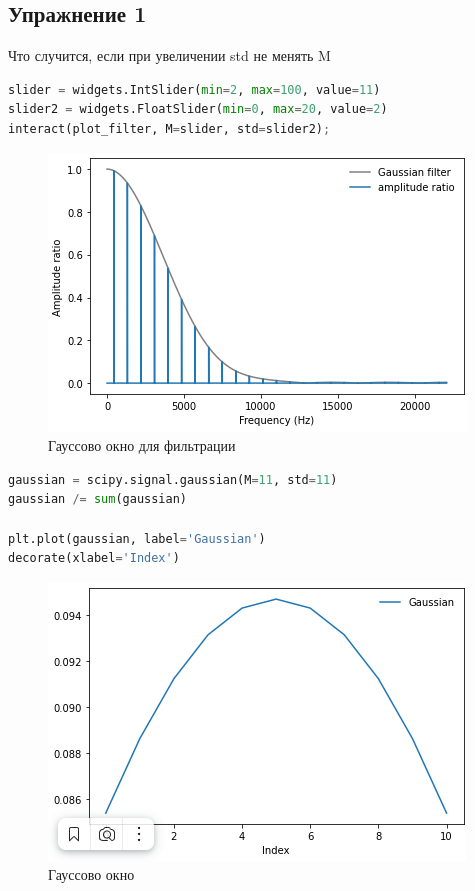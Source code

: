 \subsection{Упражнение 1}

Что случится, если при увеличении std не менять M

\begin{lstlisting}[language=Python]
slider = widgets.IntSlider(min=2, max=100, value=11)
slider2 = widgets.FloatSlider(min=0, max=20, value=2)
interact(plot_filter, M=slider, std=slider2);
\end{lstlisting}

\begin{figure}[H]
	\begin{center}
		\includegraphics[scale=1]{fig/lab08/lab8_1.png}
		\caption{Гауссово окно для фильтрации}
	\end{center}
\end{figure}

\begin{lstlisting}[language=Python]
gaussian = scipy.signal.gaussian(M=11, std=11)
gaussian /= sum(gaussian)

plt.plot(gaussian, label='Gaussian')
decorate(xlabel='Index')
\end{lstlisting}
\begin{figure}[H]
	\begin{center}
		\includegraphics[scale=0.7]{fig/lab08/lab8_2.png}
		\caption{Гауссово окно}
	\end{center}
\end{figure}


